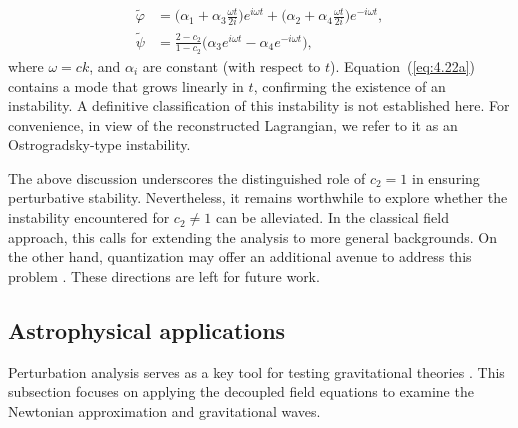 \documentclass[aps,prd,twocolumn]{revtex4-2}
\begin{document}
\begin{subequations}
\begin{align}
  \tilde{\varphi} &= \bigl(\alpha_1 + \alpha_3\frac{\omega t}{2i}\bigr) e^{i\omega t} 
    + \bigl(\alpha_2  + \alpha_4\frac{\omega t}{2i}\bigr) e^{-i\omega t}, \label{eq:4.22a}\\
  \tilde{\psi} &= \frac{2-c_2}{1-c_2} \bigl(\alpha_3 e^{i\omega t} - \alpha_4 e^{-i\omega t}\bigr),
\end{align}
\end{subequations}
where $\omega=ck$, and $\alpha_i$ are constant (with respect to $t$). Equation~(\ref{eq:4.22a}) contains a mode that grows linearly in $t$, confirming the existence of an instability. A definitive classification of this instability is not established here. For convenience, in view of the reconstructed Lagrangian, we refer to it as an Ostrogradsky-type instability.

The above discussion underscores the distinguished role of $c_2=1$ in ensuring perturbative stability. Nevertheless, it remains worthwhile to explore whether the instability encountered for $c_2\neq1$ can be alleviated. In the classical field approach, this calls for extending the analysis to more general backgrounds. On the other hand, quantization may offer an additional avenue to address this problem \cite{Kaparulin2014.EurPhysJC.74.3072,Raidal2017.NuclPhysB.916.607,Donoghue2021.PRD.104.045010}. These directions are left for future work.

\subsection{Astrophysical applications}
Perturbation analysis serves as a key tool for testing gravitational theories \cite{Will2014.LRR.17.4}. This subsection focuses on applying the decoupled field equations to examine the Newtonian approximation and gravitational waves.
\end{document}
